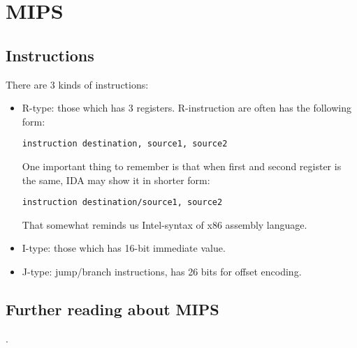 ﻿\chapter{ MIPS}

\section{Instructions}

There are 3 kinds of instructions:

\begin{itemize}

\item R-type: those which has 3 registers.
R-instruction are often has the following form:

\begin{lstlisting}
instruction destination, source1, source2
\end{lstlisting}

One important thing to remember is that when first and second register is the same, 
IDA may show it in shorter form:

\begin{lstlisting}
instruction destination/source1, source2
\end{lstlisting}

That somewhat reminds us Intel-syntax of x86 assembly language.

\item I-type: those which has 16-bit immediate value.
\item J-type: jump/branch instructions, has 26 bits for offset encoding.

\end{itemize}



\section{Further reading about MIPS}

\cite{MIPSRun}.
